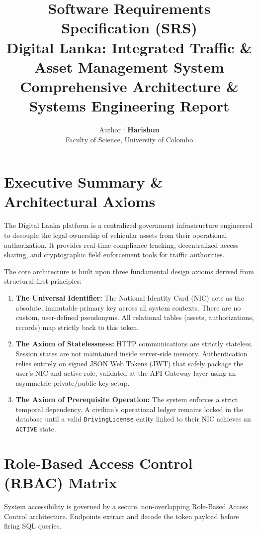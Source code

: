 \documentclass[12pt, a4paper]{article}
\title{
    \vspace{2cm}
    \textbf{\huge Software Requirements Specification (SRS)}\\
    \vspace{0.5cm}
    \large Digital Lanka: Integrated Traffic \& Asset Management System\\
    \vspace{1.5cm}
    \large \textbf{Comprehensive Architecture \& Systems Engineering Report}
}
\author{
     Author : \textbf{Harishun}\\
     Faculty of Science, University of Colombo 
}
\date{}
\begin{document}
\maketitle
\thispagestyle{empty}
\newpage

\tableofcontents
\newpage

\section{Executive Summary \& Architectural Axioms}
The Digital Lanka platform is a centralized government infrastructure engineered to decouple the legal ownership of vehicular assets from their operational authorization. It provides real-time compliance tracking, decentralized access sharing, and cryptographic field enforcement tools for traffic authorities. 

The core architecture is built upon three fundamental design axioms derived from structural first principles:
\begin{enumerate}[label=\textbf{Axiom \arabic*:}]
    \item \textbf{The Universal Identifier:} The National Identity Card (NIC) acts as the absolute, immutable primary key across all system contexts. There are no custom, user-defined pseudonyms. All relational tables (assets, authorizations, records) map strictly back to this token.
    \item \textbf{The Axiom of Statelessness:} HTTP communications are strictly stateless. Session states are not maintained inside server-side memory. Authentication relies entirely on signed JSON Web Tokens (JWT) that safely package the user's NIC and active role, validated at the API Gateway layer using an asymmetric private/public key setup.
    \item \textbf{The Axiom of Prerequisite Operation:} The system enforces a strict temporal dependency. A civilian's operational ledger remains locked in the database until a valid \texttt{DrivingLicense} entity linked to their NIC achieves an \texttt{ACTIVE} state. 
\end{enumerate}

\section{Role-Based Access Control (RBAC) Matrix}
System accessibility is governed by a secure, non-overlapping Role-Based Access Control architecture. Endpoints extract and decode the token payload before firing SQL queries.
\end{document}
